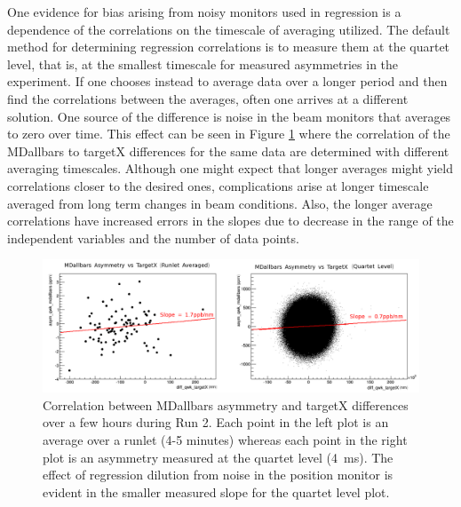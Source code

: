 One evidence for bias arising from noisy monitors used in regression is a dependence of the correlations on the timescale of averaging utilized. The default method for determining regression correlations is to measure them at the quartet level, that is, at the smallest timescale for measured asymmetries in the \Qs experiment. If one chooses instead to average data over a longer period and then find the correlations between the averages, often one arrives at a different solution. One source of the difference is noise in the beam monitors that averages to zero over time. This effect can be seen in Figure \ref{fig:regression_bias} where the correlation of the MDallbars to targetX differences for the same data are determined with different averaging timescales. Although one might expect that longer averages might yield correlations closer to the desired ones, complications arise at longer timescale averaged from long term changes in beam conditions. Also, the longer average correlations have increased errors in the slopes due to decrease in the range of the independent variables and the number of data points. 
\begin{figure}
\centering
\includegraphics[width=5.8in]{./Pictures/Regression_bias_example.png}
\caption{\label{fig:regression_bias}Correlation between MDallbars asymmetry and targetX differences over a few hours during Run 2. Each point in the left plot is an average over a runlet (4-5 minutes) whereas each point in the right plot is an asymmetry measured at the quartet level (4~ms). The effect of regression dilution from noise in the position monitor is evident in the smaller measured slope for the quartet level plot.} 
\end{figure}

